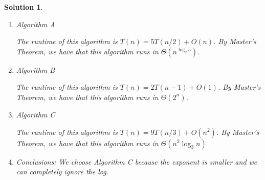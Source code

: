 \documentclass[boxes]{rutgers_hw}
\newtheorem*{solutions}{Solution}
\begin{document}
\pagebreak

\begin{exern}{2.4}
\end{exern}
\begin{solutions}
    \begin{enumerate}
        \item Algorithm A
        \begin{solution}
            The runtime of this algorithm is $T(n) = 5T(n/2) + O(n)$. By Master's Theorem, we have that this algorithm runs in $\Theta(n^{\log_{2}{5}})$.
        \end{solution}
        \item Algorithm B
        \begin{solution}
            The runtime of this algorithm is $T(n) = 2T(n-1) + O(1)$. By Master's Theorem, we have that this algorithm runs in $\Theta(2^n)$.
        \end{solution}
        \item Algorithm C
        \begin{solution}
            The runtime of this algorithm is $T(n) = 9T(n/3) + O(n^{2})$. By Master's Theorem, we have that this algorithm runs in $\Theta(n^{2}\log_{3}{n})$
        \end{solution}
        \item Conclusions: We choose Algorithm C because the exponent is smaller and we can completely ignore the log.
    \end{enumerate}
\end{solutions}
\end{document}
